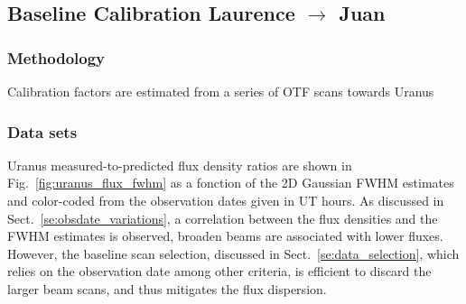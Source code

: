 \subsection{Baseline Calibration {\color{blue} Laurence $\rightarrow$ Juan } }

\subsubsection{Methodology}
Calibration factors are estimated from a series of OTF scans towards Uranus

\subsubsection{Data sets}


Uranus measured-to-predicted flux density ratios are shown in Fig.~\ref{fig:uranus_flux_fwhm} as a fonction of the 2D Gaussian FWHM estimates and color-coded from the observation dates given in UT hours. As discussed in Sect.~\ref{se:obsdate_variations}, a correlation between the flux densities and the FWHM estimates is observed, broaden beams are associated with lower fluxes. However, the baseline scan selection, discussed in Sect.~\ref{se:data_selection}, which relies on the observation date among other criteria, is efficient to discard the larger beam scans, and thus mitigates the flux dispersion.          


